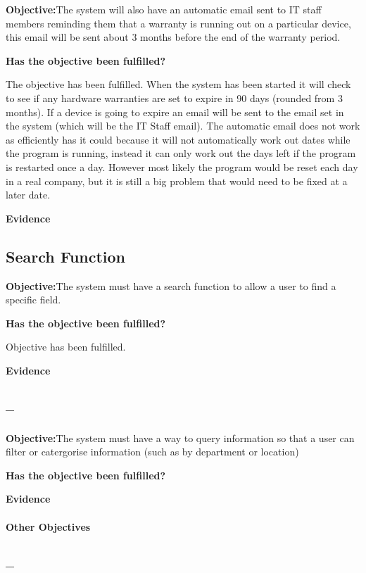 \textbf{Objective:}The system will also have an automatic email sent to IT staff members reminding them that a warranty is running out on a particular device, this email will be sent about 3 months before the end of the warranty period.

\textbf{Has the objective been fulfilled?}

The objective has been fulfilled. When the system has been started it will check to see if any hardware warranties  are set to expire in 90 days (rounded from 3 months). If a device is going to expire an email will be sent to the email set in the system (which will be the IT Staff email). The automatic email does not work as efficiently has it could because it will not automatically work out dates while the program is running, instead it can only work out the days left if the program is restarted once a day. However most likely the program would be reset each day in a real company, but it is still a big problem that would need to be fixed at a later date.

\textbf{Evidence}



\subsection{Search Function}

\textbf{Objective:}The system must have a search function to allow a user to find a specific field.

\textbf{Has the objective been fulfilled?}

Objective has been fulfilled. 

\textbf{Evidence}



\subsection{--}

\textbf{Objective:}The system must have a way to query information so that a user can filter or catergorise information (such as by department or location)

\textbf{Has the objective been fulfilled?}

\textbf{Evidence}


\paragraph{Other Objectives}

\subsection{--}

